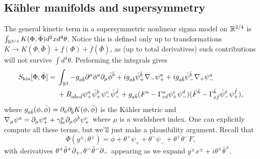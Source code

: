 \subsection*{K\"ahler manifolds and supersymmetry}
The general kinetic term in a supersymmetric nonlinear sigma model on $\mathbb{R}^{2/4}$ is $\int_{\mathbb{R}^{2/4}} K(\Phi,\bar \Phi) d^2x d^4 \theta$. Notice this is defined only up to transformations $K\to K(\Phi,\bar \Phi) + f(\Phi) + \bar f (\bar \Phi)$, as (up to total derivatives) such contributions will not survive $\int d^4 \theta$. Performing the integrals gives
\begin{align*}
    S_\text{kin}[\Phi,\bar \Phi]={}&\int_{\mathbb{R}^2} -g_{a\bar b} \partial^\mu \phi^a \partial_\mu \bar \phi^{\bar b} + ig_{a\bar b} \bar \psi_+^{\bar b} \nabla_- \psi_+^a + ig_{a\bar b} \bar \psi_-^{\bar b} \nabla_+ \psi_-^a \\
    &+ R_{a\bar b c \bar d} \psi_+^a \bar \psi_+^b \psi_-^c \bar \psi_-^{\bar d} + g_{a\bar b}(F^a- \Gamma^a_{cd} \psi_+^c \psi_-^d)(\bar F^{\bar b}-\Gamma^{\bar b}_{\bar e \bar f} \bar \psi_-^{\bar e}  \psi_+^{\bar f}),
\end{align*}
where $g_{a\bar b}(\phi,\bar \phi)=\partial_a \partial_{\bar b} K(\phi, \bar \phi)$ is the K\"ahler metric and $\nabla_\mu \psi^a= \partial_\mu \psi_+^a + \gamma^a_{bc} \partial_\mu \phi^b \psi_+^c$ where $\mu$ is a worldsheet index. One can explicitly compute all these terms, but we'll just make a plausibility argument. Recall that
\begin{equation}
    \Phi(y^\pm, \theta^\pm)=\phi + \theta^+ \psi_+ + \theta^- \psi_- + \theta^+ \theta^- F,
\end{equation}
with derivatives $\theta^+ \bar \theta^+ \partial_+, \theta^- \bar \theta^- \partial_-$ appearing as we expand $y^\pm  x^\pm + i \theta^\pm \bar \theta^\pm.$

